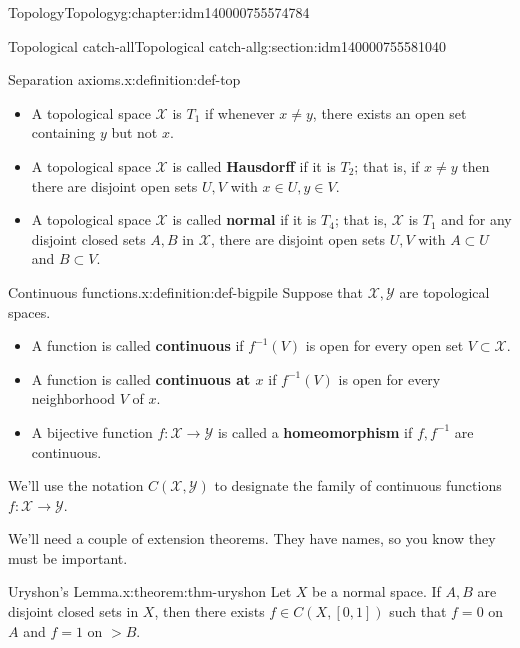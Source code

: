 \documentclass[oneside,10pt,]{book}
\newcommand{\terminology}[1]{\textbf{#1}}
\numberwithin{equation}{section}
\newcommand{\X}{\mathcal{X}}
\newcommand{\Y}{\mathcal{Y}}
\newcommand{\inv}{^{-1}}
\numberwithin{equation}{section}
\begin{document}
\begin{chapterptx}{Topology}{}{Topology}{}{}{g:chapter:idm140000755574784}
%
%
\typeout{************************************************}
\typeout{************************************************}
%
\begin{sectionptx}{Topological catch-all}{}{Topological catch-all}{}{}{g:section:idm140000755581040}
\begin{definition}{Separation axioms.}{x:definition:def-top}%
%
\begin{itemize}[label=\textbullet]
\item{}A topological space \(\X\) is \(T_1\) if whenever \(x \neq y\), there exists an open set containing \(y\) but not \(x\).%
\item{}A topological space \(\X\) is called \terminology{Hausdorff} if it is \(T_2\); that is, if \(x \neq y\) then there are disjoint open sets \(U, V\) with \(x \in U, y \in V\).%
\item{}A topological space \(\X\) is called \terminology{normal} if it is \(T_4\); that is, \(\X\) is \(T_1\) and for any disjoint closed sets \(A, B\) in \(\X\), there are disjoint open sets \(U, V\) with \(A \subset U\) and \(B \subset V\).%
\end{itemize}
%
\end{definition}
\begin{definition}{Continuous functions.}{x:definition:def-bigpile}%
Suppose that \(\X, \Y\) are topological spaces.%
\begin{itemize}[label=\textbullet]
\item{}A function is called \terminology{continuous} if \(f\inv(V)\) is open for every open set \(V \subset \X\).%
\item{}A function is called \terminology{continuous at \(x\)} if \(f\inv(V)\) is open for every neighborhood \(V\) of \(x\).%
\item{}A bijective function \(f:\X \to \Y\) is called a \terminology{homeomorphism} if \(f, f\inv\) are continuous.%
\end{itemize}
%
\end{definition}
We'll use the notation \(C(\X, \Y)\) to designate the family of continuous functions \(f: \X \to \Y\).%
\par
We'll need a couple of extension theorems. They have names, so you know they must be important.%
\begin{theorem}{Uryshon's Lemma.}{}{x:theorem:thm-uryshon}%
Let \(X\) be a normal space. If \(A, B\) are disjoint closed sets in \(X\), then there exists \(f \in C(X, [0,1])\) such that \(f = 0\) on \(A\) and \(f = 1\) on \(>B\).%

\end{theorem}
\end{sectionptx}
\end{chapterptx}
\end{document}
